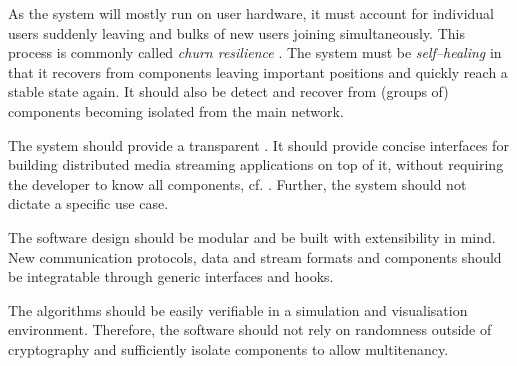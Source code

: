 \begin{enumerate}
As the system will mostly run on user hardware, it must account for individual users suddenly leaving and bulks of new users joining simultaneously. This process is commonly called \textit{churn resilience} \cite{churn-resilience, stutzbach_rejaie_2006}. The system must be \textit{self–healing} in that it recovers from components leaving important positions and quickly reach a stable state again. It should also be detect and recover from (groups of) components becoming isolated from the main network.

The system should provide a transparent . It should provide concise interfaces for building distributed media streaming applications on top of it, without requiring the developer to know all components, cf. \citet[pp. 23-25]{distributed-systems-concepts-design}. Further, the system should not dictate a specific use case.

The software design should be modular and be built with extensibility in mind. New communication protocols, data and stream formats and components should be integratable through generic interfaces and hooks.

The algorithms should be easily verifiable in a simulation and visualisation environment. Therefore, the software should not rely on randomness outside of cryptography and sufficiently isolate components to allow multitenancy.

\end{enumerate}
